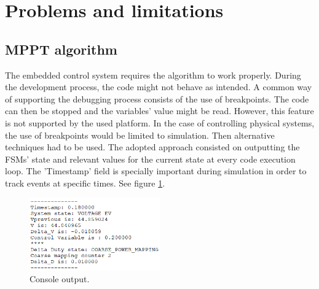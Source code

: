 \section{Problems and limitations}









\subsection{MPPT algorithm}
The embedded control system requires the algorithm to work properly. During the development process, the code might not behave as intended. A common way of supporting the debugging process consists of the use of breakpoints. 
The code can then be stopped and the variables' value might be read. However, this feature is not supported by the used platform. In the case of controlling physical systems, the use of breakpoints would be limited to simulation. Then alternative techniques had to be used. 
The adopted approach consisted on outputting the FSMs' state and relevant values for the current state at every code execution loop. 
The 'Timestamp' field is specially important during simulation in order to track events at specific times. See figure \ref{console_output}.

\begin{figure}[htbp]
	\begin{center}
		\includegraphics[width=0.5\textwidth]{../Pictures/P1/Discussion/console_output.png}
		\caption{Console output.}
		\label{console_output}
	\end{center}	
\end{figure}

